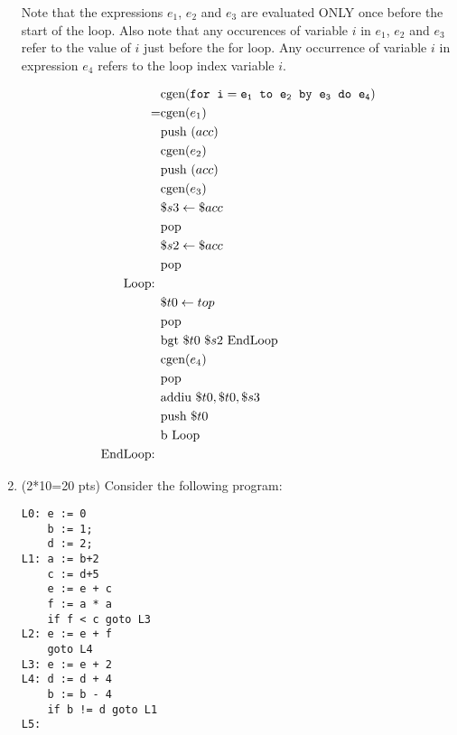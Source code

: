 \documentclass[10pt]{article}
\begin{document}
\begin{enumerate}
Note that the expressions $e_1$, $e_2$ and $e_3$ are evaluated ONLY once before the start of the loop.
Also note that any occurences of variable $i$ in $e_1$, $e_2$ and
$e_3$ refer to the value of $i$
just before the for loop.
Any occurrence of variable $i$ in expression $e_4$ refers to the loop index variable $i$.


\begin{equation}\begin{aligned}
	  & \text{cgen}(\tt{for}\;\; i = e_1 \;\;to\;\; e_2 \;\;\tt{by}\;\; e_3 \;\;\tt{do }\;\; e_4) \\
	= & \text{cgen} (e_1) 		\\
	  & \text{push } (acc)	\\
	  & \text{cgen} (e_2) 		\\
	  & \text{push } (acc)	\\
	  & \text{cgen} (e_3) 		\\
	  & \$s3 \leftarrow \$acc	\\
	  & \text{pop} 				\\
	  & \$s2 \leftarrow \$acc	\\
	  & \text{pop} 				\\
	\text{Loop: } \\
	  & \$t0 \leftarrow top 	\\
	  & \text{pop } 			\\
	  & \text{bgt } \$t0 \text{ } \$s2 \text{ EndLoop} \\
	  & \text{cgen} (e_4) 		\\
	  & \text{pop} 				\\
	  & \text{addiu } \$t0, \$t0, \$s3 	\\
	  & \text{push } \$t0 		\\
	  & \text{b Loop} 			\\
	\text{EndLoop: } 		\\
\end{aligned}\end{equation}

\pagebreak

\item (2*10=20 pts) Consider the following program:

\begin{verbatim}
L0: e := 0
    b := 1;
    d := 2;
L1: a := b+2
    c := d+5
    e := e + c
    f := a * a
    if f < c goto L3
L2: e := e + f
    goto L4
L3: e := e + 2
L4: d := d + 4
    b := b - 4
    if b != d goto L1
L5:
\end{verbatim}


\end{enumerate}
\end{document}
